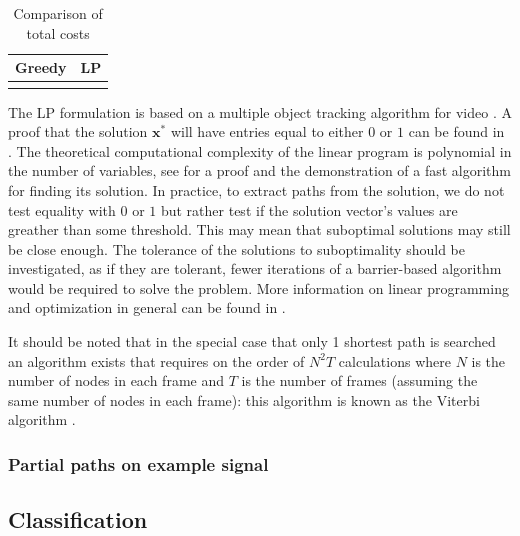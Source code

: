 \documentclass[letterpaper,12pt]{report}
\begin{document}
\begin{table}
    \caption{\label{tab:greedy_lp_cost_compare} Comparison of total costs}
    \begin{center}
        \begin{tabular}{c c}
            Greedy & LP \\
            \hline
             &
             \\
        \end{tabular}
    \end{center}
\end{table}

The LP formulation is based on a multiple object tracking algorithm for video
\cite{jiang2007linear}. A proof that the solution $\boldsymbol{x}^{\ast}$ will
have entries equal to either $0$ or $1$ can be found in
\cite[p.~167]{parker1988discrete}. The theoretical computational complexity of
the linear program is polynomial in the number of variables, see
\cite{karmarkar1984new} for a proof and the demonstration of a fast algorithm
for finding its solution. In practice, to extract paths from the solution, we do
not test equality with $0$ or $1$ but rather test if the solution vector's
values are greather than some threshold. This may mean that suboptimal solutions
may still be close enough. The tolerance of the solutions to suboptimality
should be investigated, as if they are tolerant, fewer iterations of a
barrier-based algorithm would be required to solve the problem. More information
on linear programming and optimization in general can be found in
\cite{boyd2004convex}.

It should be noted that in the special case that only 1 shortest path is
searched an algorithm exists that requires on the order of $N^{2}T$ calculations
\cite{rabiner1989tutorial} where $N$ is the number of nodes in each frame and
$T$ is the number of frames (assuming the same number of nodes in each frame):
this algorithm is known as the Viterbi algorithm \cite{forney1973viterbi}.

\subsubsection{\label{sec:mq_lp_compare_chirp}Partial paths on example signal}

\subsection{Classification}
\end{document}
